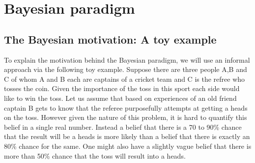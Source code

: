 
\chapter{Bayesian paradigm}
\label{ch : bayesian_paradigm}

\section{The Bayesian motivation: A toy example}
To explain the motivation behind the Bayesian paradigm, we will use an informal approach via the following toy example. Suppose there are three people A,B and C of whom A and B each are captains of a cricket team and C is the refree who tosses the coin. Given the importance of the toss in this sport each side would like to win the toss. Let us assume that based on experiences of an old friend captain B gets to know that the referee purposefully attempts at getting a heads on the toss. However given the nature of this problem, it is hard to quantify this belief in a single real number. Instead a belief that there is a 70 to 90\% chance that the result will be a heads is more likely than a belief that there is exactly an 80\% chance for the same. One might also have a slightly vague belief that there is more than 50\% chance that the toss will result into a heads. \\


